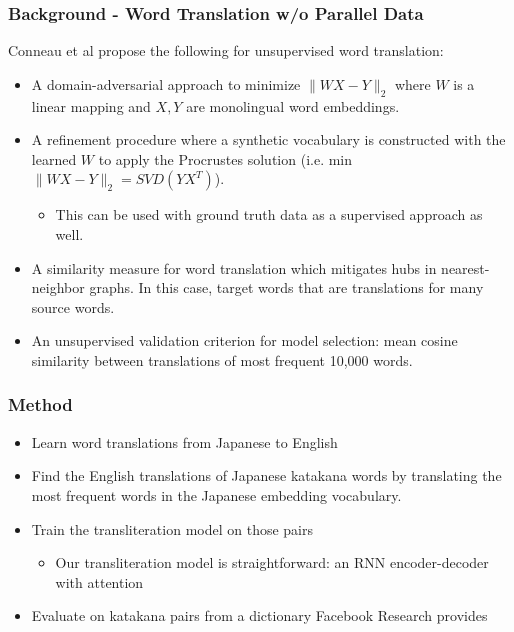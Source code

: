 \documentclass{beamer}
\begin{document}
\begin{frame}
  \frametitle{Background - Word Translation w/o Parallel Data}
  Conneau et al propose the following for unsupervised word translation:
  \begin{itemize}
    \item A domain-adversarial approach to minimize $\|WX-Y\|_2$ where $W$ is
      a linear mapping and $X,Y$ are monolingual word embeddings.
    \item A refinement procedure where a synthetic vocabulary is constructed
      with the learned $W$ to apply the Procrustes solution (i.e.
      min $\|WX-Y\|_2 = SVD(YX^T)$).
      \begin{itemize}
        \item This can be used with ground truth data as a supervised
          approach as well.
      \end{itemize}
    \item A similarity measure for word translation which mitigates hubs in
      nearest-neighbor graphs. In this case, target words that are translations
      for many source words.
    \item An unsupervised validation criterion for model selection: mean
      cosine similarity between translations of most frequent 10,000 words.
  \end{itemize}

\end{frame}

\begin{frame}
  \frametitle{Method}
  \begin{itemize}
  \item Learn word translations from Japanese to English
  \item Find the English translations of Japanese katakana words by translating
    the most frequent words in the Japanese embedding vocabulary.
  \item Train the transliteration model on those pairs
    \begin{itemize}
    \item Our transliteration model is straightforward: an RNN encoder-decoder with
      attention
    \end{itemize}
  \item Evaluate on katakana pairs from a dictionary Facebook Research provides
  \end{itemize}
\end{frame}
\end{document}
